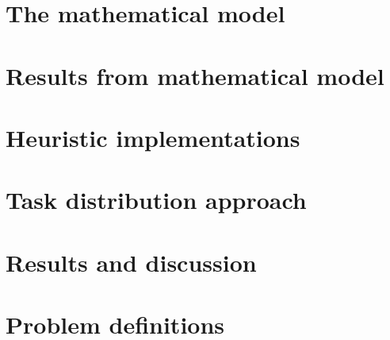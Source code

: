 \documentclass[a4paper, 10pt, twoside, openright]{book}
\begin{document}


\chapter{The mathematical model}



\chapter{Results from mathematical model}



\chapter{Heuristic implementations}




\chapter{Task distribution approach}



\chapter{Results and discussion}







\appendix
\chapter{Problem definitions} \label{definitions}
\end{document}
